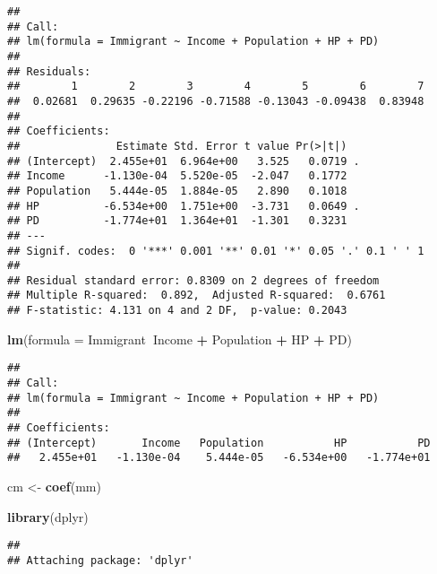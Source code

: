 \documentclass[
]{article}
\newenvironment{Shaded}{\begin{snugshade}}{\end{snugshade}}
\newcommand{\DataTypeTok}[1]{\textcolor[rgb]{0.13,0.29,0.53}{#1}}
\newcommand{\KeywordTok}[1]{\textcolor[rgb]{0.13,0.29,0.53}{\textbf{#1}}}
\newcommand{\NormalTok}[1]{#1}
\newcommand{\OperatorTok}[1]{\textcolor[rgb]{0.81,0.36,0.00}{\textbf{#1}}}
\newcommand{\StringTok}[1]{\textcolor[rgb]{0.31,0.60,0.02}{#1}}
\begin{document}
\begin{verbatim}
## 
## Call:
## lm(formula = Immigrant ~ Income + Population + HP + PD)
## 
## Residuals:
##        1        2        3        4        5        6        7 
##  0.02681  0.29635 -0.22196 -0.71588 -0.13043 -0.09438  0.83948 
## 
## Coefficients:
##               Estimate Std. Error t value Pr(>|t|)  
## (Intercept)  2.455e+01  6.964e+00   3.525   0.0719 .
## Income      -1.130e-04  5.520e-05  -2.047   0.1772  
## Population   5.444e-05  1.884e-05   2.890   0.1018  
## HP          -6.534e+00  1.751e+00  -3.731   0.0649 .
## PD          -1.774e+01  1.364e+01  -1.301   0.3231  
## ---
## Signif. codes:  0 '***' 0.001 '**' 0.01 '*' 0.05 '.' 0.1 ' ' 1
## 
## Residual standard error: 0.8309 on 2 degrees of freedom
## Multiple R-squared:  0.892,  Adjusted R-squared:  0.6761 
## F-statistic: 4.131 on 4 and 2 DF,  p-value: 0.2043
\end{verbatim}

\begin{Shaded}
\begin{Highlighting}[]
\KeywordTok{lm}\NormalTok{(}\DataTypeTok{formula =}\NormalTok{ Immigrant}\OperatorTok{~}\NormalTok{Income }\OperatorTok{+}\StringTok{ }\NormalTok{Population }\OperatorTok{+}\StringTok{ }\NormalTok{HP }\OperatorTok{+}\StringTok{ }\NormalTok{PD)}
\end{Highlighting}
\end{Shaded}

\begin{verbatim}
## 
## Call:
## lm(formula = Immigrant ~ Income + Population + HP + PD)
## 
## Coefficients:
## (Intercept)       Income   Population           HP           PD  
##   2.455e+01   -1.130e-04    5.444e-05   -6.534e+00   -1.774e+01
\end{verbatim}

\begin{Shaded}
\begin{Highlighting}[]
\NormalTok{cm <-}\StringTok{ }\KeywordTok{coef}\NormalTok{(mm)}
\end{Highlighting}
\end{Shaded}

\begin{Shaded}
\begin{Highlighting}[]
\KeywordTok{library}\NormalTok{(dplyr)}
\end{Highlighting}
\end{Shaded}

\begin{verbatim}
## 
## Attaching package: 'dplyr'
\end{verbatim}
\end{document}
